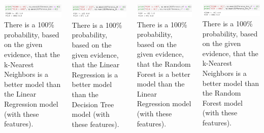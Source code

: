 \documentclass{beamer}
\begin{document}
\begin{frame}
\begin{tiny}
\begin{columns}
		\includegraphics[width=1.\textwidth]{images/prob knn lr.png}
		There is a 100\% probability, based on the given evidence, that the k-Nearest Neighbors is a better model than the Linear Regression model (with these features).  \par
		\includegraphics[width=1.\textwidth]{images/prob dt lr.png}
		There is a 100\% probability, based on the given evidence, that the Linear Regression is a better model than the Decision Tree model (with these features).  \par
		\includegraphics[width=1.\textwidth]{images/prob rf lr.png}
		There is a 100\% probability, based on the given evidence, that the Random Forest is a better model than the Linear Regression model (with these features).  \par		
		\includegraphics[width=1.\textwidth]{images/prob knn rf.png}
		There is a 100\% probability, based on the given evidence, that the k-Nearest Neighbors is a better model than the Random Forest model (with these features).  \par
			\end{columns}
	\end{tiny}

	\end{frame}
	
\end{document}
